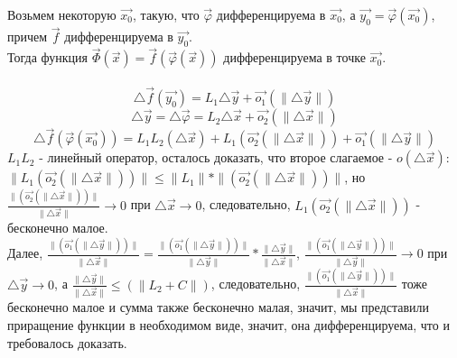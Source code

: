 \documentclass[12pt]{article}
\begin{document}
Возьмем некоторую $\overrightarrow{x_0}$, такую, что $\overrightarrow{\varphi}$ дифференцируема в $\overrightarrow{x_0}$, а $\overrightarrow{y_0} = \overrightarrow{\varphi}(\overrightarrow{x_0})$, причем $\overrightarrow{f}$ дифференцируема в $\overrightarrow{y_0}$.\\
Тогда функция $\overrightarrow{\Phi }(\overrightarrow{x}) = \overrightarrow{f}(\overrightarrow{\varphi}(\overrightarrow{x}))$ дифференцируема в точке $\overrightarrow{x_0}$.\\
\\
$${\bigtriangleup \overrightarrow{f}(\overrightarrow{y_0})}=L_1 {\bigtriangleup \overrightarrow{y}}+\overrightarrow{o_1}(\| {\bigtriangleup \overrightarrow{y}}\|)$$
$${\bigtriangleup \overrightarrow{y}} = {\bigtriangleup \overrightarrow{\varphi}} = L_2 {\bigtriangleup \overrightarrow{x}}+\overrightarrow{o_2}(\|{\bigtriangleup \overrightarrow{x}} \|)$$
$${\bigtriangleup \overrightarrow{f}(\overrightarrow{\varphi}(\overrightarrow{x_0}))} = L_1 L_2 ({\bigtriangleup \overrightarrow{x}}) + L_1 (\overrightarrow{o_2}(\| {\bigtriangleup \overrightarrow{x}}\|))+\overrightarrow{o_1}(\|{\bigtriangleup \overrightarrow{y}} \|)$$
$L_1 L_2$ - линейный оператор, осталось доказать, что второе слагаемое - $o({\bigtriangleup \overrightarrow{x}})$:\\
$\|L_1 (\overrightarrow{o_2}(\| {\bigtriangleup \overrightarrow{x}}\|))\| \leq \|L_1\| * \|(\overrightarrow{o_2}(\| {\bigtriangleup \overrightarrow{x}}\|))\|$, но\\
$\frac{\|(\overrightarrow{o_2}(\| {\bigtriangleup \overrightarrow{x}}\|))\|}{\| {\bigtriangleup \overrightarrow{x}}\|} \to 0$ при ${\bigtriangleup \overrightarrow{x}} \to 0$, следовательно, $L_1 (\overrightarrow{o_2}(\| {\bigtriangleup \overrightarrow{x}}\|))$ - бесконечно малое.\\
Далее, $\frac{\|(\overrightarrow{o_1}(\| {\bigtriangleup \overrightarrow{y}}\|))\|}{\| {\bigtriangleup \overrightarrow{x}}\|} = \frac{\|(\overrightarrow{o_1}(\| {\bigtriangleup \overrightarrow{y}}\|))\|}{\| {\bigtriangleup \overrightarrow{y}}\|} * \frac{\| {\bigtriangleup \overrightarrow{y}}\|}{\| {\bigtriangleup \overrightarrow{x}}\|}$, $\frac{\|(\overrightarrow{o_1}(\| {\bigtriangleup \overrightarrow{y}}\|))\|}{\| {\bigtriangleup \overrightarrow{y}}\|} \to 0$ при ${\bigtriangleup \overrightarrow{y}} \to 0$, а $\frac{\| {\bigtriangleup \overrightarrow{y}}\|}{\| {\bigtriangleup \overrightarrow{x}}\|} \leq (\| L_2 + C \|)$, следовательно, $\frac{\|(\overrightarrow{o_1}(\| {\bigtriangleup \overrightarrow{y}}\|))\|}{\| {\bigtriangleup \overrightarrow{x}}\|}$ тоже бесконечно малое и сумма также бесконечно малая, значит, мы представили приращение функции в необходимом виде, значит, она дифференцируема, что и требовалось доказать.\\
\end{document}
